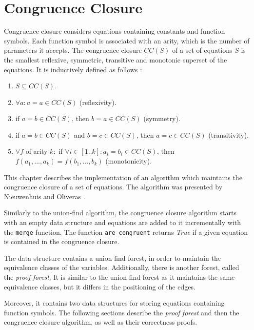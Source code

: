 
\chapter{Congruence Closure} \label{chapter:congruence_closure}

Congruence closure considers equations containing constants and function symbols. Each function symbol is associated with an arity, which is the number of parameters it accepts. The congruence closure $CC(S)$ of a set of equations $S$ is the smallest reflexive, symmetric, transitive and monotonic superset of the equations. It is inductively defined as follows \cite{congruenceclosure-ac}:

\begin{enumerate}[label=(\roman*)]
\itemsep0em
    \item $S \subseteq CC(S)$.
    \item $\forall a: a = a \in CC(S)$ (reflexivity).
    \item if $a = b \in CC(S)$, then $b = a \in CC(S)$ (symmetry).
    \item if $a = b \in CC(S)$ and $b = c \in CC(S)$, then $a = c \in CC(S)$ (transitivity).
    \item $\forall f$ of arity $k :$ if $\forall i \in [1..k]: a_i = b_i \in CC(S)$, then $f(a_1, ..., a_k) = f(b_1,..., b_k)$ (monotonicity).
\end{enumerate}

This chapter describes the implementation of an algorithm which maintains the congruence closure of a set of equations.
The algorithm was presented by Nieuwenhuis and Oliveras \cite{Nieuwenhuis}.

Similarly to the union-find algorithm, the congruence closure algorithm starts with an empty data structure and equations are added to it incrementally with the \lstinline|merge| function. The function \lstinline|are_congruent| returns \emph{True} if a given equation is contained in the congruence closure.

The data structure contains a union-find forest, in order to maintain the equivalence classes of the variables. Additionally, there is another forest, called the \emph{proof forest}. It is similar to the union-find forest as it maintains the same equivalence classes, but it differs in the positioning of the edges.

Moreover, it contains two data structures for storing equations containing function symbols. The following sections describe the \emph{proof forest} and then the congruence closure algorithm, as well as their correctness proofs.


